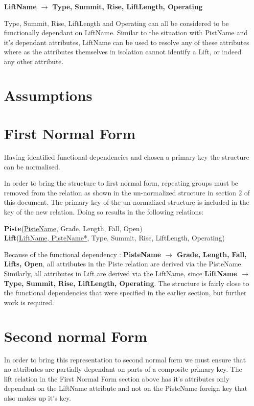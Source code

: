 \documentclass[titlepage ,12pt]{article}
\begin{document}
\textbf{LiftName \begin{math}\rightarrow\end{math} Type, Summit, Rise, LiftLength, Operating}
 
Type, Summit, Rise, LiftLength and Operating can all be considered to be functionally dependant on LiftName. Similar to the situation with PistName and it's dependant attributes, LiftName can be used to resolve any of these attributes where as the attributes themselves in isolation cannot identify a Lift, or indeed any other attribute. 

\section{Assumptions}

\section{First Normal Form}
Having identified functional dependencies and chosen a primary key the structure can be normalised.

In order to bring the structure to first normal form, repeating groups must be removed from the relation as shown in the un-normalized structure in section 2 of this document. The primary key of the un-normalized structure is included in the key of the new relation. Doing so results in the following relations:

\textbf{Piste}(\underline{PisteName}, Grade, Length, Fall, Open) \\
\textbf{Lift}(\underline{LiftName, PisteName*}, Type, Summit, Rise, LiftLength, Operating)

Because of the functional dependency : \textbf{PisteName \begin{math}\rightarrow\end{math} Grade, Length, Fall, Lifts, Open}, all attributes in the Piste relation are derived via the PisteName.
Similarly, all attributes in Lift are derived via the LiftName, since \textbf{LiftName \begin{math}\rightarrow\end{math} Type, Summit, Rise, LiftLength, Operating}.
The structure is fairly close to the functional dependencies that were specified in the earlier section, but further work is required.

 


\section{Second normal Form}
In order to bring this representation to second normal form we must ensure that no attributes are partially dependant on parts of a composite primary key. The lift relation in the First Normal Form section above has it's attributes only dependant on the LiftName attribute and not on the PisteName foreign key that also makes up it's key. 
\end{document}
